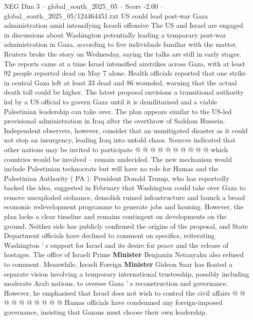 \begin{textsample}{NEG Dim 3 – global\_south\_2025\_05 – Score -2.00 – global\_south\_2025\_05/124464451.txt}  \label{ex:f3_neg_173}
US could lead post-war Gaza administration amid intensifying Israeli offensive The US and Israel are engaged in discussions about Washington potentially leading a temporary post-war administration in Gaza, according to five individuals familiar with the matter.
Reuters broke the story on Wednesday, saying the talks are still in early stages.
The reports came at a time Israel intensified airstrikes across Gaza, with at least 92 people reported dead on May 7 alone.
Health officials reported that one strike in central Gaza left at least 33 dead and 86 wounded, warning that the actual death toll could be higher.
The latest proposal envisions a transitional authority led by a US official to govern Gaza until it is demilitarised and a viable Palestinian leadership can take over.
The plan appears similar to the US-led provisional administration in Iraq after the overthrow of Saddam Hussein.
Independent observers, however, consider that an unmitigated disaster as it could not stop an insurgency, leading Iraq into untold chaos.
Sources indicated that other nations may be invited to participate @ @ @ @ @ @ @ @ @ @ which countries would be involved -- remain undecided.
The new mechanism would include Palestinian technocrats but will have no role for Hamas and the Palestinian Authority ( PA ).
President Donald Trump, who has reportedly backed the idea, suggested in February that Washington could take over Gaza to remove unexploded ordnance, demolish ruined infrastructure and launch a broad economic redevelopment programme to generate jobs and housing.
However, the plan lacks a clear timeline and remains contingent on developments on the ground.
Neither side has publicly confirmed the origins of the proposal, and State Department officials have declined to comment on specifics, reiterating Washington ' s support for Israel and its desire for peace and the release of hostages.
The office of Israeli Prime \textbf{Minister} Benjamin Netanyahu also refused to comment.
Meanwhile, Israeli Foreign \textbf{Minister} Gideon Saar has floated a separate vision involving a temporary international trusteeship, possibly including moderate Arab nations, to oversee Gaza ' s reconstruction and governance.
However, he emphasised that Israel does not wish to control the civil affairs @ @ @ @ @ @ @ @ @ @ Hamas officials have condemned any foreign-imposed governance, insisting that Gazans must choose their own leadership.

\end{textsample}
